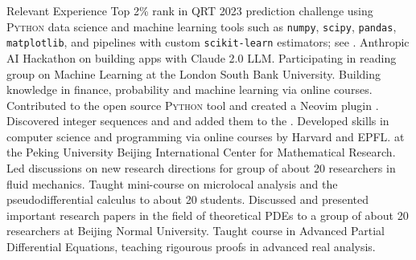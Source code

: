 


\begin{rubric}{Relevant Experience}
  \entry*[2023\myhori{} ] Top 2\% rank in QRT 2023 prediction challenge using \textsc{Python} data science and machine learning tools such as \texttt{numpy}, \texttt{scipy}, \texttt{pandas}, \texttt{matplotlib}, and pipelines with custom \texttt{scikit-learn} estimators; see .
  \entry*[2023\myhori{} ]  Anthropic AI Hackathon on building apps with Claude 2.0 LLM.
  \entry*[2023\myhori{} ] Participating in reading group on Machine Learning at the London South Bank University.
  \entry*[2023\myhori{} ] Building knowledge in finance, probability and machine learning via online courses.
  \entry*[2023\myhori{} ] Contributed to the open source \textsc{Python} tool  and created a Neovim plugin .
  \entry*[2023\myhori{} ] Discovered integer sequences  and  and added them to the .
  \entry*[2022\myhori{} ] Developed skills in computer science and programming via online courses by Harvard and EPFL. 
  \entry*[2022\myhori{} ]  at the Peking University Beijing International Center for Mathematical Research. 
  \entry*[2021\myhori{} ]Led discussions on new research directions for group of about 20 researchers in fluid mechanics. 
  \entry*[2020\myhori{} ] Taught mini-course on microlocal analysis and the pseudodifferential calculus to about 20 students.
  \entry*[2020\myhori{} ] Discussed and presented important research papers in the field of theoretical PDEs to a group of about 20 researchers at Beijing Normal University.
  \entry*[2019\myhori{} ] Taught course in Advanced Partial Differential Equations, teaching rigourous proofs in advanced real analysis.
%


\end{rubric}
